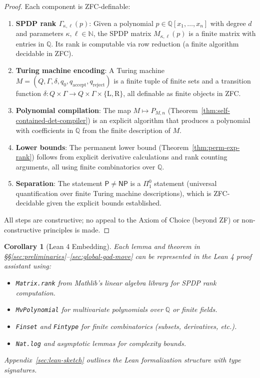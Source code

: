 \documentclass[12pt]{article}
\newtheorem{corollary}[theorem]{Corollary}
\theoremstyle{definition}
\theoremstyle{definition}
\theoremstyle{remark}
\theoremstyle{remark}
\begin{document}
\begin{proof}
Each component is ZFC-definable:
\begin{enumerate}
\item \textbf{SPDP rank $\Gamma_{\kappa,\ell}(p)$}: Given a polynomial $p \in \mathbb{Q}[x_1, \ldots, x_n]$ with degree $d$ and parameters $\kappa, \ell \in \mathbb{N}$, the SPDP matrix $M_{\kappa,\ell}(p)$ is a finite matrix with entries in $\mathbb{Q}$. Its rank is computable via row reduction (a finite algorithm decidable in ZFC).

\item \textbf{Turing machine encoding}: A Turing machine $M = (Q, \Gamma, \delta, q_0, q_{\mathrm{accept}}, q_{\mathrm{reject}})$ is a finite tuple of finite sets and a transition function $\delta : Q \times \Gamma \to Q \times \Gamma \times \{\mathrm{L}, \mathrm{R}\}$, all definable as finite objects in ZFC.

\item \textbf{Polynomial compilation}: The map $M \mapsto P_{M,n}$ (Theorem~\ref{thm:self-contained-det-compiler}) is an explicit algorithm that produces a polynomial with coefficients in $\mathbb{Q}$ from the finite description of $M$.

\item \textbf{Lower bounds}: The permanent lower bound (Theorem~\ref{thm:perm-exp-rank}) follows from explicit derivative calculations and rank counting arguments, all using finite combinatorics over $\mathbb{Q}$.

\item \textbf{Separation}: The statement $\mathsf{P} \neq \mathsf{NP}$ is a $\Pi^0_1$ statement (universal quantification over finite Turing machine descriptions), which is ZFC-decidable given the explicit bounds established.
\end{enumerate}
All steps are constructive; no appeal to the Axiom of Choice (beyond ZF) or non-constructive principles is made.
\end{proof}

\begin{corollary}[Lean 4 Embedding]\label{cor:lean-embedding}
Each lemma and theorem in \S\S\ref{sec:preliminaries}--\ref{sec:global-god-move} can be represented in the Lean 4 proof assistant using:
\begin{itemize}
\item \texttt{Matrix.rank} from Mathlib's linear algebra library for SPDP rank computation.
\item \texttt{MvPolynomial} for multivariate polynomials over $\mathbb{Q}$ or finite fields.
\item \texttt{Finset} and \texttt{Fintype} for finite combinatorics (subsets, derivatives, etc.).
\item \texttt{Nat.log} and asymptotic lemmas for complexity bounds.
\end{itemize}
Appendix~\ref{sec:lean-sketch} outlines the Lean formalization structure with type signatures.
\end{corollary}
\end{document}
